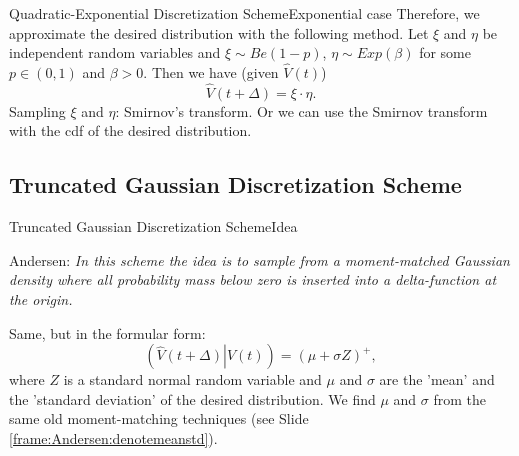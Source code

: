     \begin{frame}{Quadratic-Exponential Discretization Scheme}{Exponential case}
        Therefore, we approximate the desired distribution with the following method. Let $\xi$ and $\eta$ be independent random variables and  $\xi \sim Be(1-p)$, $\eta \sim Exp(\beta)$ for some $p \in (0, 1)$ and $\beta > 0$. Then we have (given $\hat{V}(t)$)
        \begin{equation}
            \hat{V}(t+\Delta) = \xi\cdot\eta.
        \end{equation}
        Sampling $\xi$ and $\eta$: Smirnov's transform. Or we can use the Smirnov transform with the cdf of the desired distribution.
    \end{frame}

\subsection{Truncated Gaussian Discretization Scheme}
    \begin{frame}{Truncated Gaussian Discretization Scheme}{Idea}
        \begin{block}{Andersen:}
            \emph{In this scheme the idea is to sample from a moment-matched Gaussian density where all probability
            mass below zero is inserted into a delta-function at the origin.}
        \end{block} 
        Same, but in the formular form:
        \begin{equation}
            \left(\left.\hat{V}(t+\Delta)\right| V(t)\right) = \left(\mu + \sigma Z\right)^+,
        \end{equation}
        where $Z$ is a standard normal random variable and $\mu$ and $\sigma$ are the 'mean' and the 'standard deviation' of the desired distribution.
        We find $\mu$ and $\sigma$ from the same old moment-matching techniques (see Slide \ref{frame:Andersen:denotemeanstd}).
    \end{frame}